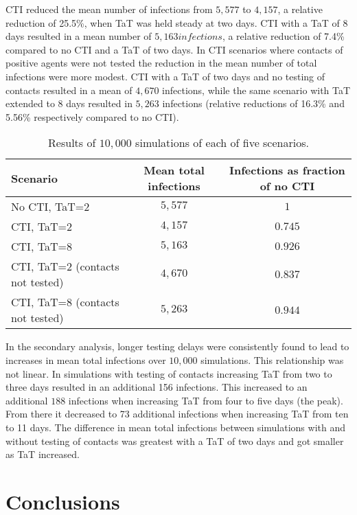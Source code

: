 \documentclass{article}
\begin{document}
CTI reduced the mean number of infections from $5,577$ to $4,157$, a relative
reduction of 25.5\%, when TaT was held steady at two days. CTI with a TaT of 8
days resulted in a mean number of $5,163 infections$, a relative reduction of 7.4\%
compared to no CTI and a TaT of two days. In CTI scenarios where contacts of
positive agents were not tested the reduction in the mean number of total
infections were more modest. CTI with a TaT of two days and no testing of contacts
resulted in a mean of $4,670$ infections, while the same scenario with TaT
extended to 8 days resulted in $5,263$ infections (relative reductions of 16.3\%
and 5.56\% respectively compared to no CTI).

\begin{table}[ht!]
  \centering
  \begin{tabular}{|l|c|c|}
    \hline
  Scenario & Mean total infections & Infections as fraction of no CTI \\ \hline
  No CTI, TaT=2 & $5,577$ & $1$  \\ \hline
  CTI, TaT=2 & $4,157$ & $0.745$  \\ \hline
  CTI, TaT=8 & $5,163$ & $0.926$  \\ \hline
  CTI, TaT=2 (contacts not tested) & $4,670$ & $0.837$  \\ \hline
  CTI, TaT=8 (contacts not tested) & $5,263$ & $0.944$  \\ \hline
\end{tabular}
  \caption{Results of $10,000$ simulations of each of five scenarios.}
  \label{table:results_scenarios}
\end{table}

In the secondary analysis, longer testing delays were consistently found to lead
to increases in mean total infections over $10,000$ simulations. This
relationship was not linear. In simulations with testing of contacts increasing
TaT from two to three days resulted in an additional 156 infections. This
increased to an additional $188$ infections when increasing TaT from four to
five days (the peak). From there it decreased to 73 additional infections when
increasing TaT from ten to 11 days. The difference in mean total infections
between simulations with and without testing of contacts was greatest with a TaT
of two days and got smaller as TaT increased.

\section{Conclusions}\label{conclusions}
\end{document}

